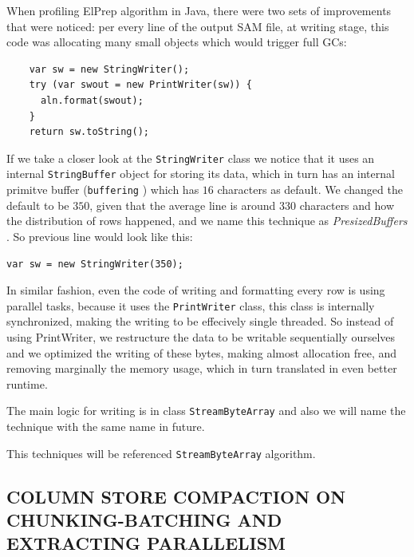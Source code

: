 \documentclass[a4paper,twoside]{article}
\begin{document}
When profiling ElPrep algorithm in Java, there were two sets of improvements that were noticed: per every line of the output SAM file, at writing stage, this code was allocating many small objects which
would trigger full GCs:

\begin{verbatim}
    var sw = new StringWriter();
    try (var swout = new PrintWriter(sw)) {
      aln.format(swout);
    }
    return sw.toString();
\end{verbatim}

If we take a closer look at the {\texttt{StringWriter}} class we notice that it uses an internal {\texttt{StringBuffer}} object for storing its data, which in turn has an internal primitve buffer  ({\texttt{buffering} } \cite{oaks:2014}) which has $16$ characters as default.
We changed the default to be $350$, given that the average line is around 330 characters and how
the distribution of rows happened, and we name this technique as {\textit{PresizedBuffers} }.
So previous line would look like this:
\begin{verbatim}
var sw = new StringWriter(350);
\end{verbatim}

In similar fashion, even the code of writing and formatting every row is using parallel tasks,
because it uses the {\texttt{PrintWriter}} class, this class is internally synchronized, making the writing to be effecively single threaded. So instead of using PrintWriter, we restructure the data
to be writable sequentially ourselves and we optimized the writing of these bytes, making almost allocation free, and removing marginally the memory usage, which in turn translated in even better runtime.

The main logic for writing is in class {\texttt{StreamByteArray}} and also we will name the technique with the same name in future.

This techniques will be referenced {\texttt{StreamByteArray}} algorithm.

\subsection{\uppercase{Column Store Compaction on Chunking-Batching and Extracting Parallelism}} 
\label{subsec:batching}
\end{document}
